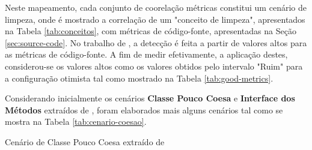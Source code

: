Neste mapeamento, cada conjunto de coorelação métricas constitui um cenário de limpeza, onde é mostrado a correlação de um "conceito de limpeza", apresentados na Tabela \ref{tab:conceitos}, com métricas de código-fonte, apresentadas na Seção \ref{sec:source-code}. No trabalho de , a detecção é feita a partir de valores altos para as métricas de código-fonte.  A fim de medir efetivamente, a aplicação destes, considerou-se os valores altos como os valores obtidos pelo intervalo "Ruim" para a configuração otimista tal como mostrado na Tabela \ref{tab:good-metrics}.  

Considerando inicialmente os cenários \textbf{Classe Pouco Coesa} e \textbf{Interface dos Métodos} extraídos de , foram elaborados mais alguns cenários tal como se mostra na Tabela \ref{tab:cenario-coesao}.

\begin{table}
\begin{table}[H]

\caption{Cenário de Classe Pouco Coesa extraído de }
\label{tab:cenario-coesao}
\end{table}
\FloatBarrier
\end{table}

